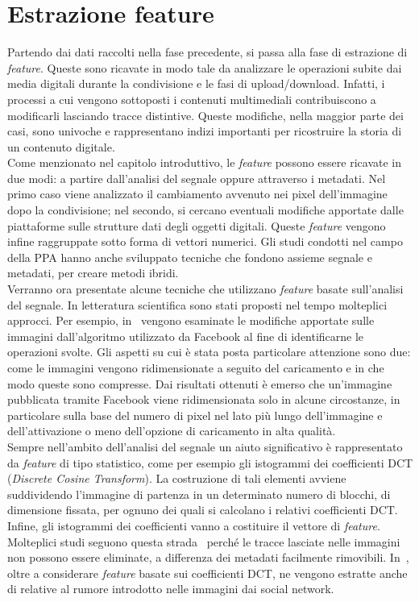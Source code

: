 \section{Estrazione feature}
\label{sec:feature}
Partendo dai dati raccolti nella fase precedente, si passa alla fase di estrazione di \textit{feature}. Queste sono ricavate in modo tale da analizzare le operazioni subite dai media digitali durante la condivisione e le fasi di upload/download. Infatti, i processi a cui vengono sottoposti i contenuti multimediali contribuiscono a modificarli lasciando tracce distintive. Queste modifiche, nella maggior parte dei casi, sono univoche e rappresentano indizi importanti per ricostruire la storia di un contenuto digitale.\\
Come menzionato nel capitolo introduttivo, le \textit{feature} possono essere ricavate in due modi: a partire dall'analisi del segnale oppure attraverso i metadati. Nel primo caso viene analizzato il cambiamento avvenuto nei pixel dell'immagine dopo la condivisione; nel secondo, si cercano eventuali modifiche apportate dalle piattaforme sulle strutture dati degli oggetti digitali. Queste \textit{feature} vengono infine raggruppate sotto forma di vettori numerici. Gli studi condotti nel campo della PPA hanno anche sviluppato tecniche che fondono assieme segnale e metadati, per creare metodi ibridi.\\
Verranno ora presentate alcune tecniche che utilizzano \textit{feature} basate sull'analisi del segnale. In letteratura scientifica sono stati proposti nel tempo molteplici approcci. Per esempio, in~\cite{moltisanti2015image} vengono esaminate le modifiche apportate sulle immagini dall'algoritmo utilizzato da Facebook al fine di identificarne le operazioni svolte. Gli aspetti su cui è stata posta particolare attenzione sono due: come le immagini vengono ridimensionate a seguito del caricamento e in che modo queste sono compresse. Dai risultati ottenuti è emerso che un'immagine pubblicata tramite Facebook viene ridimensionata solo in alcune circostanze, in particolare sulla base del numero di pixel nel lato più lungo dell'immagine e dell'attivazione o meno dell'opzione di caricamento in alta qualità.\\
Sempre nell'ambito dell'analisi del segnale un aiuto significativo è rappresentato da \textit{feature} di tipo statistico, come per esempio gli istogrammi dei coefficienti DCT (\textit{Discrete Cosine Transform}). La costruzione di tali elementi avviene suddividendo l'immagine di partenza in un determinato numero di blocchi, di dimensione fissata, per ognuno dei quali si calcolano i relativi coefficienti DCT. Infine, gli istogrammi dei coefficienti vanno a costituire il vettore di \textit{feature}. Molteplici studi seguono questa strada~\cite{caldelli2017image, amerini2017tracing, amerini2019social} perché le tracce lasciate nelle immagini non possono essere eliminate, a differenza dei metadati facilmente rimovibili. In~\cite{amerini2019social}, oltre a considerare \textit{feature} basate sui coefficienti DCT, ne vengono estratte anche di relative al rumore introdotto nelle immagini dai social network.\\
